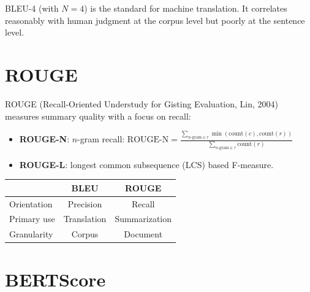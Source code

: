 \begin{remark}
BLEU-4 (with $N=4$) is the standard for machine translation. It
correlates reasonably with human judgment at the corpus level but
poorly at the sentence level.
\end{remark}

\section{ROUGE}
\label{sec:eval:rouge}

\begin{definition}[ROUGE]
ROUGE (Recall-Oriented Understudy for Gisting Evaluation, Lin, 2004)
measures summary quality with a focus on recall:
\begin{itemize}
    \item \textbf{ROUGE-N}: $n$-gram recall:
    $\text{ROUGE-N} = \frac{\sum_{\text{$n$-gram} \in r}
    \min(\text{count}(c), \text{count}(r))}
    {\sum_{\text{$n$-gram} \in r} \text{count}(r)}$
    \item \textbf{ROUGE-L}: longest common subsequence (LCS) based F-measure.
\end{itemize}
\end{definition}

\begin{proposition}
\begin{center}
\renewcommand{\arraystretch}{1.3}
\begin{tabular}{lcc}
    \toprule
    & \textbf{BLEU} & \textbf{ROUGE} \\
    \midrule
    Orientation & Precision & Recall \\
    Primary use & Translation & Summarization \\
    Granularity & Corpus & Document \\
    \bottomrule
\end{tabular}
\end{center}
\end{proposition}

\section{BERTScore}
\label{sec:eval:bertscore}

